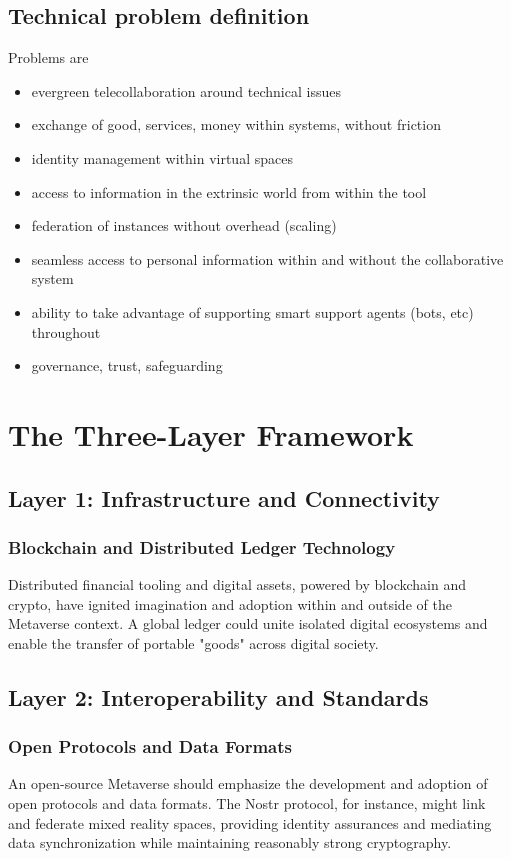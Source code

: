 \subsection{Technical problem definition}
Problems are
\begin{itemize}
\item evergreen telecollaboration around technical issues
\item exchange of good, services, money within systems, without friction
\item identity management within virtual spaces
\item access to information in the extrinsic world from within the tool
\item federation of instances without overhead (scaling)
\item seamless access to personal information within and without the collaborative system
\item ability to take advantage of supporting smart support agents (bots, etc) throughout
\item governance, trust, safeguarding
\end{itemize}

\section{The Three-Layer Framework}
\subsection{Layer 1: Infrastructure and Connectivity}
\subsubsection{Blockchain and Distributed Ledger Technology}
Distributed financial tooling and digital assets, powered by blockchain and crypto, have ignited imagination and adoption within and outside of the Metaverse context. A global ledger could unite isolated digital ecosystems and enable the transfer of portable "goods" across digital society.

\subsection{Layer 2: Interoperability and Standards}
\subsubsection{Open Protocols and Data Formats}
An open-source Metaverse should emphasize the development and adoption of open protocols and data formats. The Nostr protocol, for instance, might link and federate mixed reality spaces, providing identity assurances and mediating data synchronization while maintaining reasonably strong cryptography.

